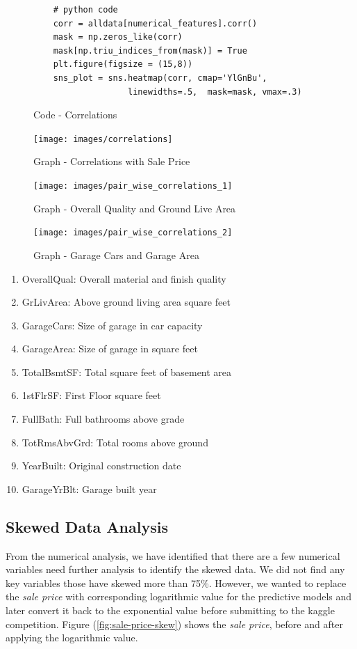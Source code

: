 \documentclass[sigconf]{acmart}
\begin{document}
	\begin{figure}[htb]
	\begin{verbatim}	
	# python code 
	corr = alldata[numerical_features].corr()	
	mask = np.zeros_like(corr)
	mask[np.triu_indices_from(mask)] = True	
	plt.figure(figsize = (15,8))	
	sns_plot = sns.heatmap(corr, cmap='YlGnBu', 
	               linewidths=.5,  mask=mask, vmax=.3)	
	\end{verbatim}
	\caption{Code - Correlations} \label{c:cor} 
	\end{figure}

	\begin{figure}[htb]
		\centering
		\texttt{[image: images/correlations]}	
		\caption{Graph - Correlations with Sale Price} \label{fig:correlations} 
	\end{figure}
		
	\begin{figure}[htb]
		\centering
		\texttt{[image: images/pair\_wise\_correlations\_1]}	
		\caption{Graph - Overall Quality and Ground Live Area} \label{fig:pair-wise-correlations} 
	\end{figure}

	\begin{figure}[htb]
	\centering
	\texttt{[image: images/pair\_wise\_correlations\_2]}	
	\caption{Graph - Garage Cars and Garage Area} \label{fig:pair-wise-correlations-2} 
	\end{figure}

	\begin{enumerate}
		\item OverallQual: Overall material and finish quality
		\item GrLivArea: Above ground living area square feet
		\item GarageCars: Size of garage in car capacity
		\item GarageArea: Size of garage in square feet
		\item TotalBsmtSF: Total square feet of basement area
		\item 1stFlrSF: First Floor square feet
		\item FullBath: Full bathrooms above grade
		\item TotRmsAbvGrd: Total rooms above ground
		\item YearBuilt: Original construction date
		\item GarageYrBlt: Garage built year		
	\end{enumerate}

	\subsection{Skewed Data Analysis}
	From the numerical analysis, we have identified that there are a few numerical variables need further analysis to identify the skewed data. We did not find any key variables those have skewed more than 75\%. However, we wanted to replace the {\em sale price} with corresponding logarithmic value for the predictive models and later convert it back to the exponential value before submitting to the kaggle competition. Figure (\ref{fig:sale-price-skew}) shows the {\em sale price}, before and after applying the logarithmic value. 
	
\end{document}

